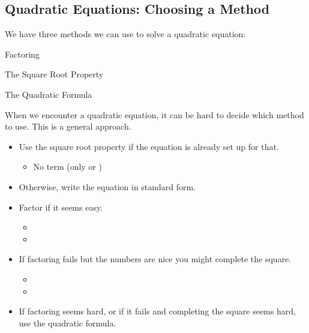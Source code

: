 \subsection{Quadratic Equations: Choosing a Method} 
We have three methods we can use to solve a quadratic equation:
\begin{enumerate*}
\item Factoring
\item The Square Root Property
\item The Quadratic Formula
\end{enumerate*}
When we encounter a quadratic equation, it can be hard to decide which method to use. This is a general approach.
\begin{itemize}
\item Use the square root property if the equation is already set up for that.
\begin{itemize}
\item No \makeblanksmall term (only \makeblanksmall or \makeblank[1in])
\end{itemize}
\item Otherwise, write the equation in standard form.
\item Factor if it seems easy.
\begin{itemize}
\item \makeblankfill{}
\item \makeblankfill{}
\end{itemize}
\item If factoring fails but the numbers are nice you might complete the square.
\begin{itemize}
\item {}
\item \makeblankfill{}
\end{itemize}
\item If factoring seems hard, or if it fails and completing the square seems hard, use the quadratic formula.
\end{itemize}